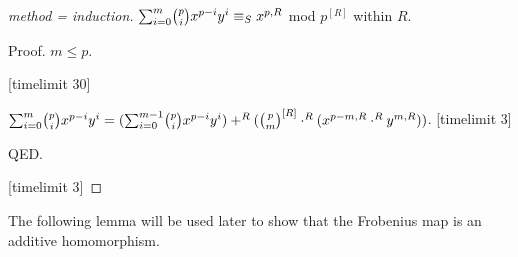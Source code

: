 \documentclass[english,11pt]{article}
\begin{document}
\begin{forthel}
\begin{proof}[method = induction]


$\binsum{m}{p}{x}{y}{R}  
\equiv_{S} x^{p,R} $ mod $p^{[R]}$ within $R$.

Proof. $m \leq p$. 

[timelimit 30]

$\binsum{m}{p}{x}{y}{R} = 
(\binsum{m-1}{p}{x}{y}{R}) +^{R} (\cho{p}{m}^{[R]} \cdot^{R} (x^{p - m,R} \cdot^{R} y^{m,R}))$.
[timelimit 3]

QED.

[timelimit 3]

\end{proof}
\end{forthel}
The following lemma will be used later to show that the Frobenius
map is an additive homomorphism.
\end{document}
